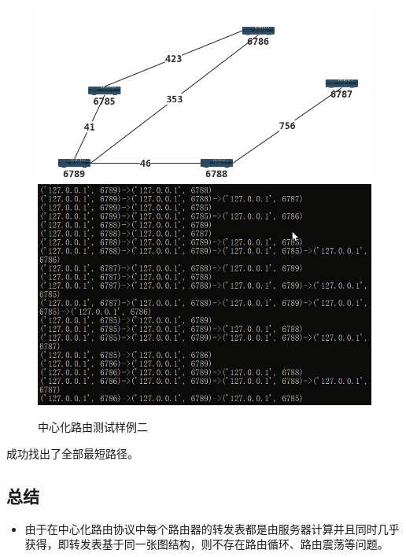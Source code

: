 		\begin{figure}[H]
			\centering
			\includegraphics[scale=0.4]{imgs/topo3/topo2.png}
			\includegraphics[scale=1]{imgs/cenTest2.PNG}
			\caption{中心化路由测试样例二}
			\label{fig:CentralizedTest2}
		\end{figure}
		成功找出了全部最短路径。
	\subsection{总结} %
	\label{sub:总结}
		\begin{itemize}
			\item 由于在中心化路由协议中每个路由器的转发表都是由服务器计算并且同时几乎获得，即转发表基于同一张图结构，则不存在路由循环、路由震荡等问题。
		\end{itemize}
